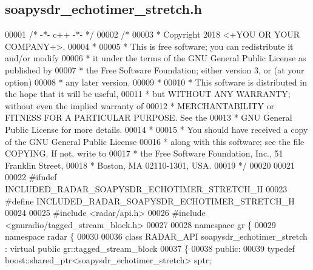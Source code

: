 \subsection{soapysdr\+\_\+echotimer\+\_\+stretch.\+h}
\label{soapysdr__echotimer__stretch_8h_source}

\begin{DoxyCode}
00001 \textcolor{comment}{/* -*- c++ -*- */}
00002 \textcolor{comment}{/*}
00003 \textcolor{comment}{ * Copyright 2018 <+YOU OR YOUR COMPANY+>.}
00004 \textcolor{comment}{ *}
00005 \textcolor{comment}{ * This is free software; you can redistribute it and/or modify}
00006 \textcolor{comment}{ * it under the terms of the GNU General Public License as published by}
00007 \textcolor{comment}{ * the Free Software Foundation; either version 3, or (at your option)}
00008 \textcolor{comment}{ * any later version.}
00009 \textcolor{comment}{ *}
00010 \textcolor{comment}{ * This software is distributed in the hope that it will be useful,}
00011 \textcolor{comment}{ * but WITHOUT ANY WARRANTY; without even the implied warranty of}
00012 \textcolor{comment}{ * MERCHANTABILITY or FITNESS FOR A PARTICULAR PURPOSE.  See the}
00013 \textcolor{comment}{ * GNU General Public License for more details.}
00014 \textcolor{comment}{ *}
00015 \textcolor{comment}{ * You should have received a copy of the GNU General Public License}
00016 \textcolor{comment}{ * along with this software; see the file COPYING.  If not, write to}
00017 \textcolor{comment}{ * the Free Software Foundation, Inc., 51 Franklin Street,}
00018 \textcolor{comment}{ * Boston, MA 02110-1301, USA.}
00019 \textcolor{comment}{ */}
00020 
00021 
00022 \textcolor{preprocessor}{#ifndef INCLUDED\_RADAR\_SOAPYSDR\_ECHOTIMER\_STRETCH\_H}
00023 \textcolor{preprocessor}{#define INCLUDED\_RADAR\_SOAPYSDR\_ECHOTIMER\_STRETCH\_H}
00024 
00025 \textcolor{preprocessor}{#include <radar/api.h>}
00026 \textcolor{preprocessor}{#include <gnuradio/tagged\_stream\_block.h>}
00027 
00028 \textcolor{keyword}{namespace }gr \{
00029   \textcolor{keyword}{namespace }radar \{
00030 
00036     \textcolor{keyword}{class }RADAR_API soapysdr_echotimer_stretch : \textcolor{keyword}{virtual} \textcolor{keyword}{public} gr::tagged\_stream\_block
00037     \{
00038      \textcolor{keyword}{public}:
00039       \textcolor{keyword}{typedef} boost::shared\_ptr<soapysdr\_echotimer\_stretch> sptr;

\end{DoxyCode}
